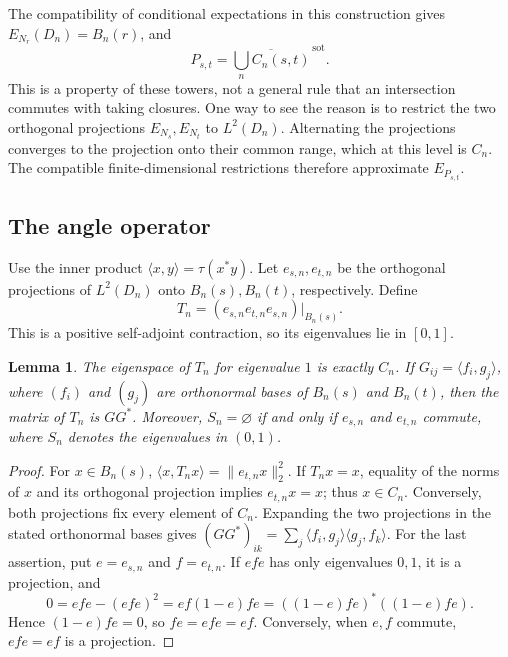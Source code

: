 \documentclass[11pt]{article}
\newtheorem{lemma}[theorem]{Lemma}
\theoremstyle{definition}
\theoremstyle{remark}
\newcommand{\tr}{\tau}
\newcommand{\sot}{\mathrm{sot}}
\begin{document}
The compatibility of conditional expectations in this construction gives
\(E_{N_r}(D_n)=B_n(r)\), and
\begin{equation}\label{eq:closure}
 P_{s,t}=\overline{\bigcup_n C_n(s,t)}^{\,\sot}.
\end{equation}
This is a property of these towers, not a general rule that an
intersection commutes with taking closures. One way to see the reason
is to restrict the two orthogonal projections \(E_{N_s},E_{N_t}\) to
\(L^2(D_n)\). Alternating the projections converges to the projection
onto their common range, which at this level is \(C_n\). The compatible
finite-dimensional restrictions therefore approximate \(E_{P_{s,t}}\).

\subsection{The angle operator}
Use the inner product \(\langle x,y\rangle=\tr(x^*y)\).
Let \(e_{s,n},e_{t,n}\) be the orthogonal projections of \(L^2(D_n)\)
onto \(B_n(s),B_n(t)\), respectively. Define
\begin{equation}\label{eq:angle}
 T_n=(e_{s,n}e_{t,n}e_{s,n})\big|_{B_n(s)}.
\end{equation}
This is a positive self-adjoint contraction, so its eigenvalues lie
in \([0,1]\).

\begin{lemma}\label{lem:intersection}
The eigenspace of \(T_n\) for eigenvalue \(1\) is exactly \(C_n\).
If \(G_{ij}=\langle f_i,g_j\rangle\), where \((f_i)\) and \((g_j)\)
are orthonormal bases of \(B_n(s)\) and \(B_n(t)\), then the matrix
of \(T_n\) is \(GG^*\).
Moreover, \(S_n=\varnothing\) if and only if \(e_{s,n}\) and
\(e_{t,n}\) commute, where \(S_n\) denotes the eigenvalues in \((0,1)\).
\end{lemma}
\begin{proof}
For \(x\in B_n(s)\),
\(\langle x,T_nx\rangle=\|e_{t,n}x\|_2^2\).
If \(T_nx=x\), equality of the norms of \(x\) and its orthogonal
projection implies \(e_{t,n}x=x\); thus \(x\in C_n\).
Conversely, both projections fix every element of \(C_n\).
Expanding the two projections in the stated orthonormal bases gives
\((GG^*)_{ik}=\sum_j\langle f_i,g_j\rangle\langle g_j,f_k\rangle\).
For the last assertion, put \(e=e_{s,n}\) and \(f=e_{t,n}\).
If \(efe\) has only eigenvalues \(0,1\), it is a projection, and
\[
 0=efe-(efe)^2=ef(1-e)fe=((1-e)fe)^*((1-e)fe).
\]
Hence \((1-e)fe=0\), so \(fe=efe=ef\). Conversely, when \(e,f\)
commute, \(efe=ef\) is a projection.
\end{proof}
\end{document}
